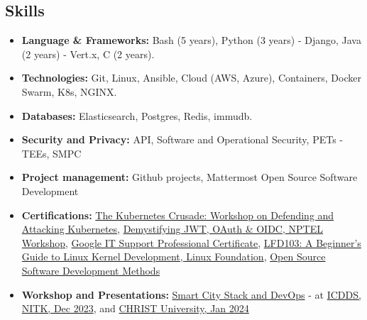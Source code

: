 \documentclass[a4paper,11pt]{article}
\begin{document}
\subsection*{Skills}
\begin{itemize}
\item  \textbf{Language \& Frameworks:} Bash (5 years), Python (3 years) - Django, Java (2 years) - Vert.x, C (2 years).
\item \textbf{Technologies:} Git, Linux, Ansible, Cloud (AWS, Azure), Containers, Docker Swarm, K8s,
NGINX.
\item \textbf{Databases:} Elasticsearch, Postgres, Redis, immudb.
\item \textbf{Security and Privacy:} API, Software and Operational Security, PETs - TEEs, SMPC 
\item  \textbf{Project management:} Github projects, Mattermost Open Source Software Development
\item \textbf{Certifications:} \href{https://www.linkedin.com/in/abhi5782-/details/certifications/}{The Kubernetes Crusade: Workshop on Defending and Attacking Kubernetes}, \href{https://elearn.nptel.ac.in/Ecertificate/?q=NPWS22369227122778}{Demystifying JWT, OAuth \& OIDC, NPTEL Workshop}, \href {https://www.youracclaim.com/badges/848a4c99-ab00-449f-afed-59bc88c6a0cd/linked_in_profile}{Google IT Support Professional Certificate}, \href{https://www.credly.com/badges/c2fbeef3-6d43-4213-af28-0f68dedd3334/linked_in_profile}{LFD103: A Beginner's Guide to Linux Kernel Development, Linux Foundation}, \href{https://www.coursera.org/account/accomplishments/certificate/TE3G9PXUEUTR}{Open Source Software Development Methods} 
\item \textbf{Workshop and Presentations:} \href{https://abhi4578.github.io/conf-meetups/workshops/smart-city-and-introduction-to-devops-workshop/}{Smart City Stack and DevOps} - at \href{https://icdds.org/smartcity.html}{ICDDS, NITK, Dec 2023}, and \href{https://edu.ieee.org/in-cucs/events/smart-city-stack-and-devops/}{CHRIST University, Jan 2024}
\end{itemize}
\end{document}

